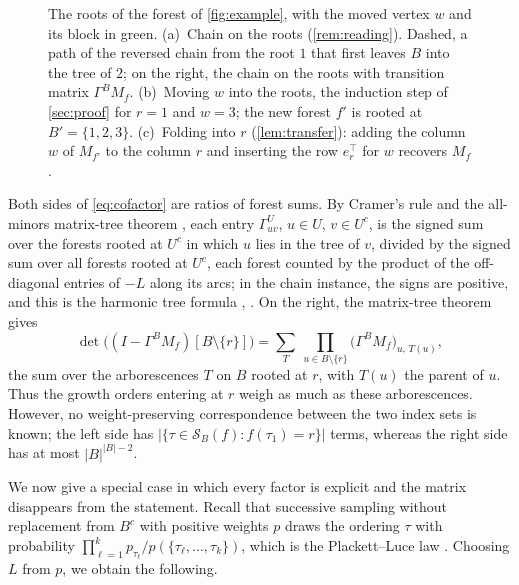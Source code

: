 \documentclass[onefignum,onetabnum]{siamart250211}
\numberwithin{theorem}{section}
\numberwithin{equation}{section}
\newcommand{\Orders}{\mathcal{S}}
\begin{document}
\begin{figure}[t]
{}
\caption{The roots of the forest of \cref{fig:example}, with the
moved vertex $w$ and its block in green. (a)~Chain on the roots
(\cref{rem:reading}). Dashed, a path of the reversed chain from the root
$1$ that first leaves $B$ into the tree of $2$; on the right, the chain
on the roots with transition matrix $\Gamma^BM_f$. (b)~Moving $w$ into
the roots, the induction step of \cref{sec:proof} for $r=1$ and $w=3$;
the new forest $f'$ is rooted at $B'=\{1,2,3\}$. (c)~Folding into $r$
(\cref{lem:transfer}): adding the column $w$ of $M_{f'}$ to the column
$r$ and inserting the row $e_r^{\top}$ for $w$ recovers $M_f$.}
\label{fig:transfer}
\end{figure}
\begin{remark}\label{rem:forest}
Both sides of \eqref{eq:cofactor} are ratios of forest sums. By
Cramer's rule and the all-minors matrix-tree theorem \cite{Chaiken1982},
each entry $\Gamma^U_{uv}$, $u\in U$, $v\in U^c$, is the signed sum over
the forests rooted at $U^c$ in which $u$ lies in the tree of $v$,
divided by the signed sum over all forests rooted at $U^c$, each forest
counted by the product of the off-diagonal entries of $-L$ along its
arcs; in the chain instance, the signs are positive, and this is the
harmonic tree formula \cite[(1.9)]{PitmanTang2018}, \cite{Pokarowski1999}.
On the right, the matrix-tree theorem \cite{Tutte1948,Chaiken1982} gives
\begin{equation}\label{eq:arborescence}
\det\big((I-\Gamma^BM_f)[B\setminus\{r\}]\big)
=\sum_{T}\ \prod_{u\in B\setminus\{r\}}\big(\Gamma^BM_f\big)_{u,\,T(u)},
\end{equation}
the sum over the arborescences $T$ on $B$ rooted at $r$, with $T(u)$
the parent of $u$. Thus the growth orders entering
at $r$ weigh as much as these arborescences. However, no
weight-preserving correspondence between the two index sets is known;
the left side has $|\{\tau\in\Orders_B(f):f(\tau_1)=r\}|$ terms, whereas the right side has at
most $|B|^{|B|-2}$.
\end{remark}
We now give a special case in which every factor is explicit and the
matrix disappears from the statement. Recall that successive sampling
without replacement from $B^c$ with positive weights $p$ draws the
ordering $\tau$ with probability
$\prod_{\ell=1}^{k}p_{\tau_\ell}/p(\{\tau_\ell,\dots,\tau_k\})$, which is
the Plackett--Luce law \cite{Luce1959,Plackett1975}. Choosing $L$ from $p$, we
obtain the following.
\end{document}

